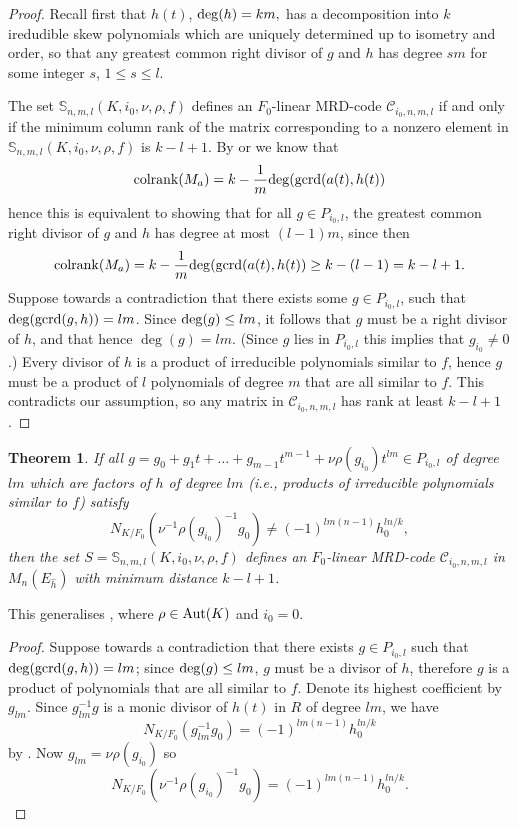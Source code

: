 \documentclass[12pt]{amsart}
\theoremstyle{plain}
\newtheorem{theorem}{Theorem}[section]
\theoremstyle{definition}
\numberwithin{equation}{section}
\numberwithin{figure}{section}
\begin{document}
\begin{proof}
Recall first that  $h(t)$, ${\rm deg}(h)=km,$ has a decomposition into $k$ iredudible skew polynomials which are uniquely determined up to isometry and order, so that any greatest common right divisor of $g$ and $h$ has degree $sm$ for some integer $s$, $1\leq s\leq l$.

The set
$\mathbb{S}_{n,m,l}(K,i_0,\nu,\rho, f)$ defines an $F_0$-linear MRD-code $\mathcal{C}_{i_0, n,m,l}$
if and only if the minimum column rank of the matrix corresponding to a nonzero element in $\mathbb{S}_{n,m,l}(K,i_0,\nu,\rho, f)$ is $k-l+1$.
By \cite[Theorem 3.13]{NewS}  or \cite[Theorem 7]{PT2} we know that
$${\rm colrank}(M_a)= k - \frac{1}{m}{\rm deg}({\rm gcrd}(a(t),h(t))$$
hence this is equivalent to showing that  for all $g\in P_{i_0,l}$,
the greatest common right divisor of $g$ and $h$ has degree at most $(l-1)m$, since then
$${\rm colrank}(M_a)= k - \frac{1}{m}{\rm deg}({\rm gcrd}(a(t),h(t))\geq k-(l-1)=k-l+1.$$
Suppose towards a contradiction that there exists some $g\in P_{i_0,l}$, such that ${\rm deg}({\rm gcrd}(g,h))=lm$. Since ${\rm deg}(g)\leq lm$, it follows that $g$ must be a right divisor of $h$, and that hence $\deg (g)=lm$. (Since $g$ lies in $P_{i_0,l}$ this implies that $g_{i_0}\not=0$.)
 Every divisor of $h$ is a product of irreducible polynomials similar to $f$, hence $g$ must be a product of $l$ polynomials of degree $m$ that are all similar to $f$.
  This contradicts our assumption, so any matrix in $\mathcal{C}_{i_0, n,m,l}$ has rank at least $k-l+1$.
\end{proof}


\begin{theorem} \label{thm:alsomain}
  If all $g=g_0+g_1t+\dots+g_{m-1}t^{m-1}+\nu\rho(g_{i_0})t^{lm} \in P_{i_0,l}$
of degree $lm$ which are factors  of $h$  of degree $lm$ (i.e., products of irreducible polynomials similar to $f$) satisfy
$$N_{K/F_0}(\nu^{-1} \rho(g_{i_0})^{-1}  g_0 )\not=(-1)^{lm(n-1)}h_0^{ln/k},$$
then the set $S=\mathbb{S}_{n,m,l}(K,i_0,\nu,\rho, f)$ defines an $F_0$-linear MRD-code $\mathcal{C}_{i_0, n,m,l}$  in $M_n(E_{\hat{h}})$ with minimum distance $k-l+1$.
\end{theorem}

This generalises \cite[Theorem 5.1]{NewS}, where $\rho\in {\rm Aut}(K)$ and $i_0=0$.

\begin{proof}
  Suppose towards a contradiction that there exists $g\in P_{i_0,l}$ such that ${\rm deg}({\rm gcrd}(g,h))=lm$; since ${\rm deg}(g)\leq lm$,  $g$ must be a divisor of $h$, therefore $g$ is a product of polynomials that are all similar to $f$. Denote its highest coefficient by $g_{lm}$.
Since  $g_{lm}^{-1}g$ is a monic divisor of $h(t)$ in $R$ of degree $lm$, we have
$$N_{K/F_0}(g_{lm}^{-1}g_0 )=(-1)^{lm(n-1)}h_0^{ln/k}$$
 by \cite[Theorem 3.15]{NewS}.
 Now $g_{lm}=\nu \rho(g_{i_0})$ so
 $$N_{K/F_0}(\nu^{-1} \rho(g_{i_0})^{-1}  g_0 )=(-1)^{lm(n-1)}h_0^{ln/k}.$$
\end{proof}
\end{document}
